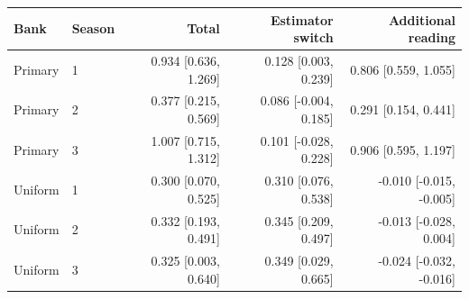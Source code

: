 \begin{tabular}{llrrr}
\toprule
Bank & Season & Total & Estimator switch & Additional reading \\
\midrule
Primary & 1 & 0.934 [0.636, 1.269] & 0.128 [0.003, 0.239] & 0.806 [0.559, 1.055] \\
Primary & 2 & 0.377 [0.215, 0.569] & 0.086 [-0.004, 0.185] & 0.291 [0.154, 0.441] \\
Primary & 3 & 1.007 [0.715, 1.312] & 0.101 [-0.028, 0.228] & 0.906 [0.595, 1.197] \\
Uniform & 1 & 0.300 [0.070, 0.525] & 0.310 [0.076, 0.538] & -0.010 [-0.015, -0.005] \\
Uniform & 2 & 0.332 [0.193, 0.491] & 0.345 [0.209, 0.497] & -0.013 [-0.028, 0.004] \\
Uniform & 3 & 0.325 [0.003, 0.640] & 0.349 [0.029, 0.665] & -0.024 [-0.032, -0.016] \\
\bottomrule
\end{tabular}
